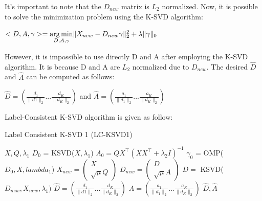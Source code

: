 It's important to note that the $D_{new}$ matrix is $L_2$ normalized. Now, it is possible to solve the minimization problem using the K-SVD algorithm:
\begin{center}
 $<D,A,\gamma> = \underset{D,A,\gamma}{\operatorname*{arg\,min}} \| X_{new} - D_{new}\gamma \|^2_2 + \lambda \|\gamma\|_0$
\end{center}
However, it is impossible to use directly D and A  after employing the K-SVD algorithm. It is because D and A are $L_2$ normalized due to $D_{new}$. The desired $\hat{D}$ and $\hat{A}$ can be computed as follows:\vspace{0.5cm}\begin{center}
$\hat{D} = (
\frac{d_1}{\|d1\|_2}  ...  \frac{d_K}{\|d_K\|_2} 
)$   and $\hat{A} =
(\frac{a_1}{\|d_1\|_2}  ...  \frac{a_K}{\|d_K\|_2} 
)$
\end{center}
Label-Consistent K-SVD algorithm is given as follow:
\begin{algorithm}
 \caption{Label Consistent K-SVD 1 (LC-KSVD1)}
 \begin{algorithmic}
  \REQUIRE $X, Q, \lambda_1$
  \STATE $D_0$ = KSVD($X, \lambda_1$)
  \STATE $A_0 = Q  X^{\intercal} (X  X^{\intercal} + \lambda_2  I)^{-1}$
  \STATE $\gamma_0$ = OMP($D_0, X, lambda_1$)
  \STATE $X_{new}  =  \begin{pmatrix} 
    X  \\
    \sqrt{\mu}Q
    \end{pmatrix}$
  \STATE $D_{new} =  \begin{pmatrix} 
    D  \\
    \sqrt{\mu}A
    \end{pmatrix}$
  \STATE $ D = $ KSVD($D_{new}, X_{new}, \lambda_1)$
  \STATE $\hat{D} = (
\frac{d_1}{\|d1\|_2}  ...  \frac{d_K}{\|d_K\|_2} 
)$
\STATE $\hat{A} =
(\frac{a_1}{\|d_1\|_2}  ...  \frac{a_K}{\|d_K\|_2} 
)$
\RETURN $\hat{D}, \hat{A}$
 \end{algorithmic}

\end{algorithm}




